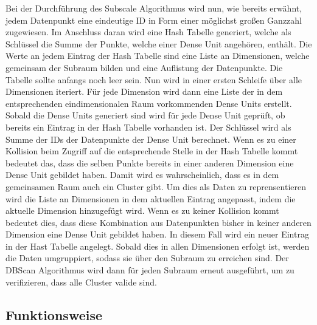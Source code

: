 \documentclass[utf8,biblatex]{lni}
\begin{document}
Bei der Durchführung des Subscale Algorithmus wird nun, wie bereits erwähnt, jedem Datenpunkt eine eindeutige ID in Form einer möglichst großen Ganzzahl zugewiesen. 
Im Anschluss daran wird eine Hash Tabelle generiert, welche als Schlüssel die Summe der Punkte, welche einer Dense Unit angehören, enthält. 
Die Werte an jedem Eintrag der Hash Tabelle sind eine Liste an Dimensionen, welche gemeinsam der Subraum bilden und eine Auflistung der Datenpunkte. 
Die Tabelle sollte anfangs noch leer sein. 
Nun wird in einer ersten Schleife über alle Dimensionen iteriert. 
Für jede Dimension wird dann eine Liste der in dem entsprechenden eindimensionalen Raum vorkommenden Dense Units erstellt. 
Sobald die Dense Units generiert sind wird für jede Dense Unit geprüft, ob bereits ein Eintrag in der Hash Tabelle vorhanden ist. 
Der Schlüssel wird als Summe der IDs der Datenpunkte der Dense Unit berechnet. 
Wenn es zu einer Kollision beim Zugriff auf die entsprechende Stelle in der Hash Tabelle kommt bedeutet das, dass die selben Punkte bereits in einer anderen Dimension eine Dense Unit gebildet haben. 
Damit wird es wahrscheinlich, dass es in dem gemeinsamen Raum auch ein Cluster gibt. 
Um dies als Daten zu reprensentieren wird die Liste an Dimensionen in dem aktuellen Eintrag angepasst, indem die aktuelle Dimension hinzugefügt wird. 
Wenn es zu keiner Kollision kommt bedeutet dies, dass diese Kombination aus Datenpunkten bisher in keiner anderen Dimension eine Dense Unit gebildet haben. 
In diesem Fall wird ein neuer Eintrag in der Hast Tabelle angelegt. 
Sobald dies in allen Dimensionen erfolgt ist, werden die Daten umgruppiert, sodass sie über den Subraum zu erreichen sind. 
Der DBScan Algorithmus wird dann für jeden Subraum erneut ausgeführt, um zu verifizieren, dass alle Cluster valide sind. 

\subsection{Funktionsweise}
\end{document}
